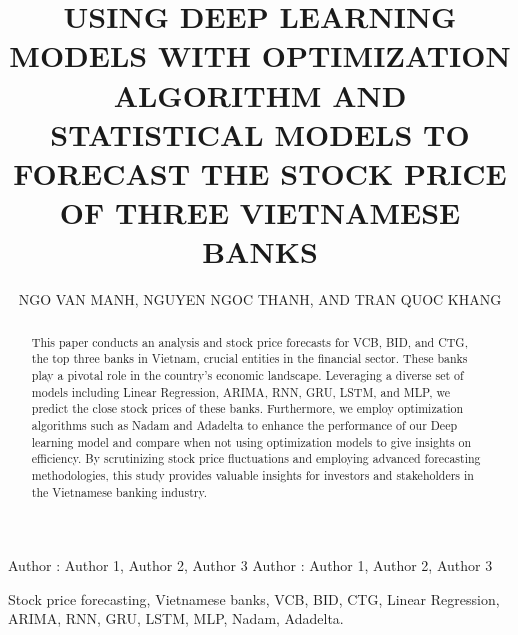 \documentclass{ieeeojies}
\begin{document}
\title{USING DEEP LEARNING MODELS WITH OPTIMIZATION ALGORITHM AND STATISTICAL MODELS TO FORECAST THE STOCK PRICE OF THREE VIETNAMESE BANKS}

\author{\uppercase{Ngo van manh},
\uppercase{Nguyen ngoc thanh, and Tran Quoc khang}}

\address[1]{Faculty of Information Systems, University of Information Technology, (e-mail: 21522328@gm.uit.edu.vn)}
\address[2]{Faculty of Information Systems, University of Information Technology, (e-mail: 21522600@gm.uit.edu.vn)}
\address[3]{Faculty of Information Systems, University of Information Technology, (e-mail: 21522200@gm.uit.edu.vn)}

\markboth
{Author \headeretal: Author 1, Author 2, Author 3}
{Author \headeretal: Author 1, Author 2, Author 3}

\begin{abstract}
This paper conducts an analysis and stock price forecasts for VCB, BID, and CTG, the top three banks in Vietnam, crucial entities in the financial sector. These banks play a pivotal role in the country's economic landscape. Leveraging a diverse set of models including Linear Regression, ARIMA, RNN, GRU, LSTM, and MLP, we predict the close stock prices of these banks. Furthermore, we employ optimization algorithms such as Nadam and Adadelta to enhance the performance of our Deep learning model and compare when not using optimization models to give insights on efficiency. By scrutinizing stock price fluctuations and employing advanced forecasting methodologies, this study provides valuable insights for investors and stakeholders in the Vietnamese banking industry.
\end{abstract}

\begin{keywords}
Stock price forecasting, Vietnamese banks, VCB, BID, CTG, Linear Regression, ARIMA, RNN, GRU, LSTM, MLP, Nadam, Adadelta.
\end{keywords}

\titlepgskip=-15pt

\maketitle
\end{document}
